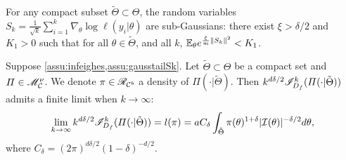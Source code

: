 \begin{assu}\label{assu:gausstailSk}
    For any compact subset $\tilde\Theta\subset\Theta$,
    the random variables
        $S_k=\frac{1}{\sqrt{k}}\sum_{i=1}^k\nabla_\theta\log\ell(y_i|\theta)    $
     are sub-Gaussians: there exist $\xi>\delta/2$ and $K_1>0$ such that for all $\theta\in\tilde\Theta$, and all $k$, $\mathbb{E}_\theta e^{\frac{\xi}{m}\|S_k\|^2}<K_1$.
\end{assu}







\begin{thm}\label{thm:refcompactpos}
    Suppose \cref{assu:infeighes,assu:gausstailSk}.  %
    Let $\tilde\Theta\subset\Theta$ be a compact set and  $\varPi\in\mathscr{M}_{\mathcal{C}}^\nu$. We denote $\pi\in\mathscr{R}_{\mathcal{C}^b}$ a density of $\varPi(\cdot|\tilde\Theta)$.
    Then $k^{d\delta/2}\mathscr{I}^k_{D_f}(\varPi(\cdot|\tilde\Theta))$ admits a finite limit when $k\to\infty$:
    \begin{equation}\label{eq:liml}
        \lim_{k\rightarrow\infty} k^{d\delta/2} \mathscr{I}^k_{D_f}(\varPi(\cdot|\tilde\Theta)) = l(\pi) =
a C_\delta \int_{\tilde\Theta}\pi(\theta)^{1+\delta} |\mathcal{I}(\theta)|^{-\delta/2}  d\theta ,
    \end{equation}
where $ C_\delta = (2\pi)^{d\delta/2} (1-\delta)^{-d/2}$.
\end{thm}

